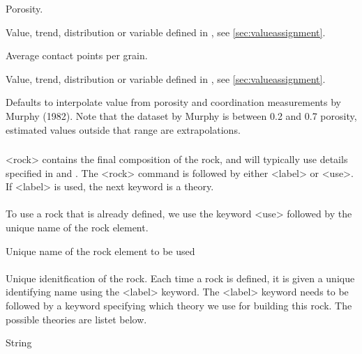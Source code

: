 {
 \slist
   \item \Description Porosity.
   \item \Argument Value, trend, distribution or variable defined in , see \autoref{sec:valueassignment}.
   \item \Default
 \elist

 \slist
   \item \Description Average contact points per grain.
   \item \Argument Value, trend, distribution or variable defined in , see \autoref{sec:valueassignment}.
   \item \Default Defaults to interpolate value from porosity and coordination measurements by Murphy (1982). Note that the dataset by Murphy is between 0.2 and 0.7 porosity, estimated values outside that range are extrapolations.
 \elist

\subsubsection{}
 \slist
   \item \Description <rock> contains the final composition of the rock, and will typically use details specified in  and . The <rock> command is followed by either <label> or <use>. If <label> is used, the next keyword is a theory.
   \item \Argument
   \item \Default
 \elist

\paragraph{}
 \slist
   \item \Description To use a rock that is already defined, we use the keyword <use> followed by the unique name of the rock element.
   \item \Argument Unique name of the rock element to be used
   \item \Default
 \elist

\paragraph{}
 \slist
   \item \Description Unique idenitfication of the rock. Each time a rock is defined, it is given a unique identifying name using
the <label> keyword. The <label> keyword needs to be followed by a keyword specifying which theory we use for building this rock. The possible theories are listet below.
   \item \Argument String
   \item \Default
 \elist

}
